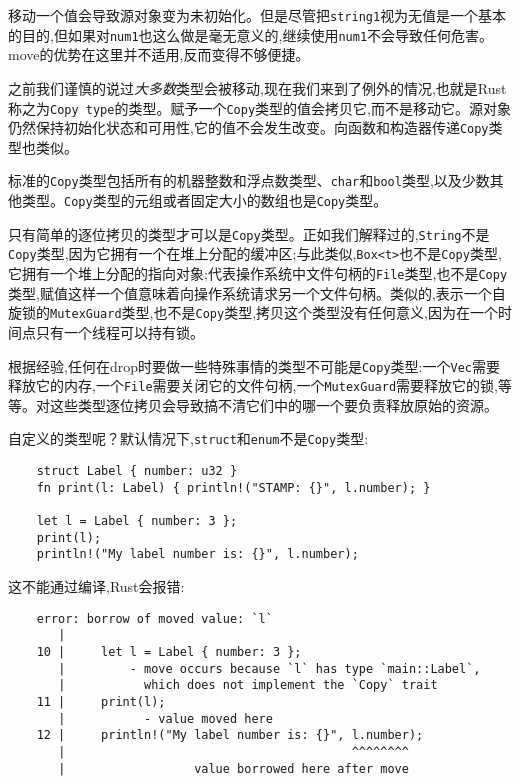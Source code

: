 移动一个值会导致源对象变为未初始化。但是尽管把\texttt{string1}视为无值是一个基本的目的,但如果对\texttt{num1}也这么做是毫无意义的,继续使用\texttt{num1}不会导致任何危害。move的优势在这里并不适用,反而变得不够便捷。

之前我们谨慎的说过\emph{大多数}类型会被移动,现在我们来到了例外的情况,也就是Rust称之为\texttt{Copy type}的类型。赋予一个\texttt{Copy}类型的值会拷贝它,而不是移动它。源对象仍然保持初始化状态和可用性,它的值不会发生改变。向函数和构造器传递\texttt{Copy}类型也类似。

标准的\texttt{Copy}类型包括所有的机器整数和浮点数类型、\texttt{char}和\texttt{bool}类型,以及少数其他类型。\texttt{Copy}类型的元组或者固定大小的数组也是\texttt{Copy}类型。

只有简单的逐位拷贝的类型才可以是\texttt{Copy}类型。正如我们解释过的,\texttt{String}不是\texttt{Copy}类型,因为它拥有一个在堆上分配的缓冲区;与此类似,\texttt{Box<t>}也不是\texttt{Copy}类型,它拥有一个堆上分配的指向对象;代表操作系统中文件句柄的\texttt{File}类型,也不是\texttt{Copy}类型,赋值这样一个值意味着向操作系统请求另一个文件句柄。类似的,表示一个自旋锁的\texttt{MutexGuard}类型,也不是\texttt{Copy}类型,拷贝这个类型没有任何意义,因为在一个时间点只有一个线程可以持有锁。

根据经验,任何在drop时要做一些特殊事情的类型不可能是\texttt{Copy}类型:一个\texttt{Vec}需要释放它的内存,一个\texttt{File}需要关闭它的文件句柄,一个\texttt{MutexGuard}需要释放它的锁,等等。对这些类型逐位拷贝会导致搞不清它们中的哪一个要负责释放原始的资源。

自定义的类型呢？默认情况下,\texttt{struct}和\texttt{enum}不是\texttt{Copy}类型:
\begin{verbatim}
    struct Label { number: u32 }
    fn print(l: Label) { println!("STAMP: {}", l.number); }

    let l = Label { number: 3 };
    print(l);
    println!("My label number is: {}", l.number);
\end{verbatim}

这不能通过编译,Rust会报错:
\begin{verbatim}
    error: borrow of moved value: `l`
       |
    10 |     let l = Label { number: 3 };
       |         - move occurs because `l` has type `main::Label`,
       |           which does not implement the `Copy` trait
    11 |     print(l);
       |           - value moved here
    12 |     println!("My label number is: {}", l.number);
       |                                        ^^^^^^^^
       |                  value borrowed here after move
\end{verbatim}

